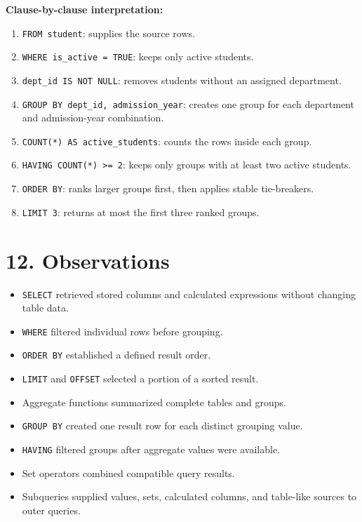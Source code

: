 \documentclass[12pt,a4paper]{article}
\begin{document}
\noindent\textbf{Clause-by-clause interpretation:}
\begin{enumerate}
    \item \texttt{FROM student}: supplies the source rows.
    \item \texttt{WHERE is\_active = TRUE}: keeps only active students.
    \item \texttt{dept\_id IS NOT NULL}: removes students without an assigned department.
    \item \texttt{GROUP BY dept\_id, admission\_year}: creates one group for each department and
    admission-year combination.
    \item \texttt{COUNT(*) AS active\_students}: counts the rows inside each group.
    \item \texttt{HAVING COUNT(*) >= 2}: keeps only groups with at least two active students.
    \item \texttt{ORDER BY}: ranks larger groups first, then applies stable tie-breakers.
    \item \texttt{LIMIT 3}: returns at most the first three ranked groups.
\end{enumerate}

\section*{12. Observations}
\begin{itemize}
    \item \texttt{SELECT} retrieved stored columns and calculated expressions without changing
    table data.
    \item \texttt{WHERE} filtered individual rows before grouping.
    \item \texttt{ORDER BY} established a defined result order.
    \item \texttt{LIMIT} and \texttt{OFFSET} selected a portion of a sorted result.
    \item Aggregate functions summarized complete tables and groups.
    \item \texttt{GROUP BY} created one result row for each distinct grouping value.
    \item \texttt{HAVING} filtered groups after aggregate values were available.
    \item Set operators combined compatible query results.
    \item Subqueries supplied values, sets, calculated columns, and table-like sources to outer
    queries.
\end{itemize}
\end{document}

